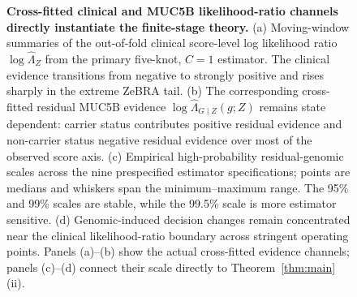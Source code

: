 {\begin{figure}[!t]
\caption{\textbf{Cross-fitted clinical and MUC5B likelihood-ratio channels directly instantiate the finite-stage theory.} (a) Moving-window summaries of the out-of-fold clinical score-level log likelihood ratio $\log\widehat\Lambda_Z$ from the primary five-knot, $C=1$ estimator. The clinical evidence transitions from negative to strongly positive and rises sharply in the extreme ZeBRA tail. (b) The corresponding cross-fitted residual MUC5B evidence $\log\widehat\Lambda_{G\mid Z}(g;Z)$ remains state dependent: carrier status contributes positive residual evidence and non-carrier status negative residual evidence over most of the observed score axis. (c) Empirical high-probability residual-genomic scales across the nine prespecified estimator specifications; points are medians and whiskers span the minimum--maximum range. The 95\% and 99\% scales are stable, while the 99.5\% scale is more estimator sensitive. (d) Genomic-induced decision changes remain concentrated near the clinical likelihood-ratio boundary across stringent operating points. Panels (a)--(b) show the actual cross-fitted evidence channels; panels (c)--(d) connect their scale directly to Theorem~\ref{thm:main}(ii).}
\label{fig:direct-lr-main}
\end{figure}%
}
